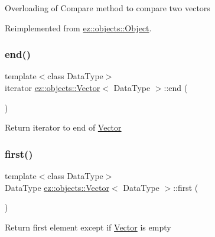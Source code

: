 Overloading of Compare method to compare two vectors 

Reimplemented from \hyperlink{classez_1_1objects_1_1Object_aca311d389dffa204e425463145f4e1e6}{ez\+::objects\+::\+Object}.

\mbox{\label{classez_1_1objects_1_1Vector_ab427cb054be9433127b77a98f5dd581f}} 
\subsubsection{\texorpdfstring{end()}{end()}}
{\footnotesize\ttfamily template$<$class Data\+Type$>$ \\
iterator \hyperlink{classez_1_1objects_1_1Vector}{ez\+::objects\+::\+Vector}$<$ Data\+Type $>$\+::end (\begin{DoxyParamCaption}{ }\end{DoxyParamCaption})\hspace{0.3cm}{\ttfamily [inline]}}

Return iterator to end of \hyperlink{classez_1_1objects_1_1Vector}{Vector} \mbox{\label{classez_1_1objects_1_1Vector_aa83f2702c3d95a1b03842b113b36ecbf}} 
\subsubsection{\texorpdfstring{first()}{first()}}
{\footnotesize\ttfamily template$<$class Data\+Type$>$ \\
Data\+Type \hyperlink{classez_1_1objects_1_1Vector}{ez\+::objects\+::\+Vector}$<$ Data\+Type $>$\+::first (\begin{DoxyParamCaption}{ }\end{DoxyParamCaption})\hspace{0.3cm}{\ttfamily [inline]}}

Return first element except if \hyperlink{classez_1_1objects_1_1Vector}{Vector} is empty \mbox{\label{classez_1_1objects_1_1Vector_af89b5f0546a049c7ade93d48eb84fa6b}} 

